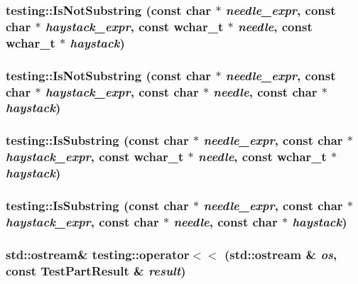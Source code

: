\subsubsection{ testing::IsNotSubstring (const char $\ast$ {\em needle\_\-expr}, const char $\ast$ {\em haystack\_\-expr}, const wchar\_\-t $\ast$ {\em needle}, const wchar\_\-t $\ast$ {\em haystack})}\label{namespacetesting_d99409245328d36bb2be994569c514af}


\subsubsection{ testing::IsNotSubstring (const char $\ast$ {\em needle\_\-expr}, const char $\ast$ {\em haystack\_\-expr}, const char $\ast$ {\em needle}, const char $\ast$ {\em haystack})}\label{namespacetesting_1301ced25bb95bc43c5c9e9fd01d5270}


\subsubsection{ testing::IsSubstring (const char $\ast$ {\em needle\_\-expr}, const char $\ast$ {\em haystack\_\-expr}, const wchar\_\-t $\ast$ {\em needle}, const wchar\_\-t $\ast$ {\em haystack})}\label{namespacetesting_ddbc23e7639f0042e9ab95a16ae240dd}


\subsubsection{ testing::IsSubstring (const char $\ast$ {\em needle\_\-expr}, const char $\ast$ {\em haystack\_\-expr}, const char $\ast$ {\em needle}, const char $\ast$ {\em haystack})}\label{namespacetesting_009f08dca0562680a5704f6f88858ed3}


\subsubsection{\setlength{\rightskip}{0pt plus 5cm}std::ostream\& testing::operator$<$$<$ (std::ostream \& {\em os}, const TestPartResult \& {\em result})}\label{namespacetesting_5812c47abd9863f4f1eef439c4378018}


